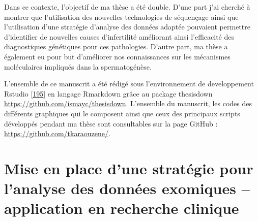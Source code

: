 \documentclass[12pt,a4paper,twoside]{ugathesis}
\theoremstyle{definition}
\theoremstyle{definition}
\theoremstyle{definition}
\theoremstyle{remark}
\begin{document}
Dans ce contexte, l'objectif de ma thèse a été double. D'une part j'ai
cherché à montrer que l'utilisation des nouvelles technologies de
séquençage ainsi que l'utilisation d'une stratégie d'analyse des données
adaptée pouvaient permettre d'identifier de nouvelles causes
d'infertilité améliorant ainsi l'efficacité des diagnostiques génétiques
pour ces pathologies. D'autre part, ma thèse a également eu pour but
d'améliorer nos connaissances sur les mécanismes moléculaires impliqués
dans la spermatogénèse.

L'ensemble de ce manuscrit a été rédigé sous l'environnement de
developpement Rstudio {[}\protect\hyperlink{ref-RStudioTeam2015}{195}{]}
en langage Rmarkdown grâce au package thesisdown
\url{https://github.com/ismayc/thesisdown}. L'ensemble du manuscrit, les
codes des différents graphiques qui le composent ainsi que ceux des
principaux scripts développés pendant ma thèse sont consultables sur la
page GitHub : \url{https://github.com/tkaraouzene/}.

\chapter{Mise en place d'une stratégie pour l'analyse des données
exomiques -- application en recherche
clinique}\label{mise-en-place-dune-strategie-pour-lanalyse-des-donnees-exomiques-application-en-recherche-clinique}

\newpage
\end{document}
